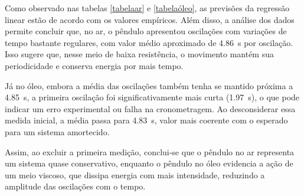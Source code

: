 Como observado nas tabelas \ref{tabelaar} e \ref{tabelaóleo}, as previsões da regressão linear estão de acordo com os valores empíricos. Além disso, a análise dos dados permite concluir que, no ar, o pêndulo apresentou oscilações com variações de tempo bastante regulares, com valor médio aproximado de \qty{4,86}{s} por oscilação. Isso sugere que, nesse meio de baixa resistência, o movimento mantém sua periodicidade e conserva energia por mais tempo.

Já no óleo, embora a média das oscilações também tenha se mantido próxima a \qty{4,85}{s}, a primeira oscilação foi significativamente mais curta (\qty{1,97}{s}), o que pode indicar um erro experimental ou falha na cronometragem. Ao desconsiderar essa medida inicial, a média passa para \qty{4,83}{s}, valor mais coerente com o esperado para um sistema amortecido.

Assim, ao excluir a primeira medição, conclui-se que o pêndulo no ar representa um sistema quase conservativo, enquanto o pêndulo no óleo evidencia a ação de um meio viscoso, que dissipa energia com mais intensidade, reduzindo a amplitude das oscilações com o tempo.




